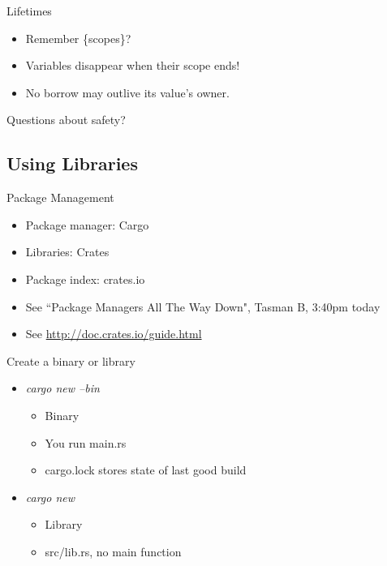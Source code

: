 \documentclass[50pt]{beamer}
\begin{document}
\begin{frame}
    Lifetimes
    \begin{itemize}
        \item Remember \{scopes\}?
        \item Variables disappear when their scope ends!
        \item No borrow may outlive its value's owner.
    \end{itemize}
\end{frame}
\begin{frame}
    Questions about safety?
\end{frame}


\subsection{Using Libraries}

\begin{frame}
    Package Management
    \begin{itemize}
        \item Package manager: Cargo
        \item Libraries: Crates
        \item Package index: crates.io
        \item See ``Package Managers All The Way Down", Tasman B, 3:40pm today
        \item See \url{http://doc.crates.io/guide.html}
    \end{itemize}
\end{frame}

\begin{frame}
    Create a binary or library
    \begin{itemize}
        \item \textit{cargo new --bin}
            \begin{itemize}
                \item Binary
                \item You run main.rs
                \item cargo.lock stores state of last good build
            \end{itemize}
        \item \textit{cargo new}
            \begin{itemize}
                \item Library
                \item src/lib.rs, no main function
            \end{itemize}
    \end{itemize}
\end{frame}
\end{document}
